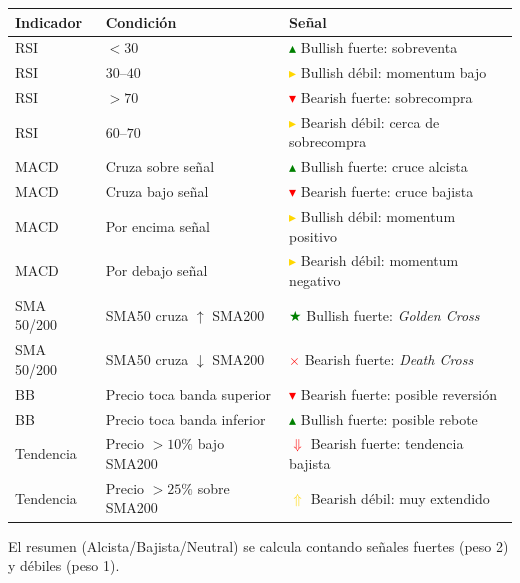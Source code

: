 \documentclass[11pt, a4paper]{article}
\begin{document}
\begin{center}
\begin{tabularx}{\textwidth}{llX}
  \toprule
  \textbf{Indicador} & \textbf{Condición} & \textbf{Señal} \\
  \midrule
  RSI & $< 30$ & \textcolor{green}{$\blacktriangle$} Bullish fuerte: sobreventa \\
  RSI & $30$--$40$ & \textcolor{gold}{$\blacktriangleright$} Bullish débil: momentum bajo \\
  RSI & $> 70$ & \textcolor{red}{$\blacktriangledown$} Bearish fuerte: sobrecompra \\
  RSI & $60$--$70$ & \textcolor{gold}{$\blacktriangleright$} Bearish débil: cerca de sobrecompra \\
  \midrule
  MACD & Cruza sobre señal & \textcolor{green}{$\blacktriangle$} Bullish fuerte: cruce alcista \\
  MACD & Cruza bajo señal  & \textcolor{red}{$\blacktriangledown$} Bearish fuerte: cruce bajista \\
  MACD & Por encima señal  & \textcolor{gold}{$\blacktriangleright$} Bullish débil: momentum positivo \\
  MACD & Por debajo señal  & \textcolor{gold}{$\blacktriangleright$} Bearish débil: momentum negativo \\
  \midrule
  SMA 50/200 & SMA50 cruza $\uparrow$ SMA200 & \textcolor{green}{$\bigstar$} Bullish fuerte: \textit{Golden Cross} \\
  SMA 50/200 & SMA50 cruza $\downarrow$ SMA200 & \textcolor{red}{$\times$} Bearish fuerte: \textit{Death Cross} \\
  \midrule
  BB & Precio toca banda superior & \textcolor{red}{$\blacktriangledown$} Bearish fuerte: posible reversión \\
  BB & Precio toca banda inferior & \textcolor{green}{$\blacktriangle$} Bullish fuerte: posible rebote \\
  \midrule
  Tendencia & Precio $> 10\%$ bajo SMA200 & \textcolor{red}{$\Downarrow$} Bearish fuerte: tendencia bajista \\
  Tendencia & Precio $> 25\%$ sobre SMA200 & \textcolor{gold}{$\Uparrow$} Bearish débil: muy extendido \\
  \bottomrule
\end{tabularx}
\end{center}

El resumen (Alcista/Bajista/Neutral) se calcula contando señales fuertes (peso 2) y débiles (peso 1).
\end{document}
